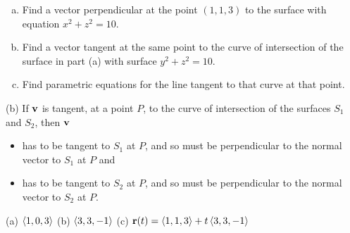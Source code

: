 \begin{question}[M200 2000D] %
\begin{enumerate}[(a)]
\item
Find a vector perpendicular at the point
$(1,1,3)$ to the surface with equation $x^2+z^2=10$.

\item 
Find a vector tangent at the same point to the curve of 
intersection of the surface in part (a) with surface $y^2+z^2=10$.

\item 
Find parametric equations for the line tangent to that curve
at that point.
\end{enumerate}
\end{question}

\begin{hint}
(b) If $\mathbf{v}$ is tangent, at a point $P$, to the curve of intersection of the
surfaces $S_1$ and $S_2$, then $\mathbf{v}$ 
\begin{itemize}\itemsep1pt \parskip0pt  %
\item
has to be tangent to $S_1$ at $P$, and so must be perpendicular to the 
normal vector to $S_1$ at $P$ and
\item
has to be tangent to $S_2$ at $P$, and so must be perpendicular to the 
normal vector to $S_2$ at $P$.
\end{itemize}
\end{hint}


\begin{answer}
(a) $\left< 1,0,3\right>$\qquad
(b) $\left< 3,3,-1\right>$\qquad
(c) $\mathbf{r}(t)=\left< 1,1,3\right>+t\left< 3,3,-1\right>$
\end{answer}

